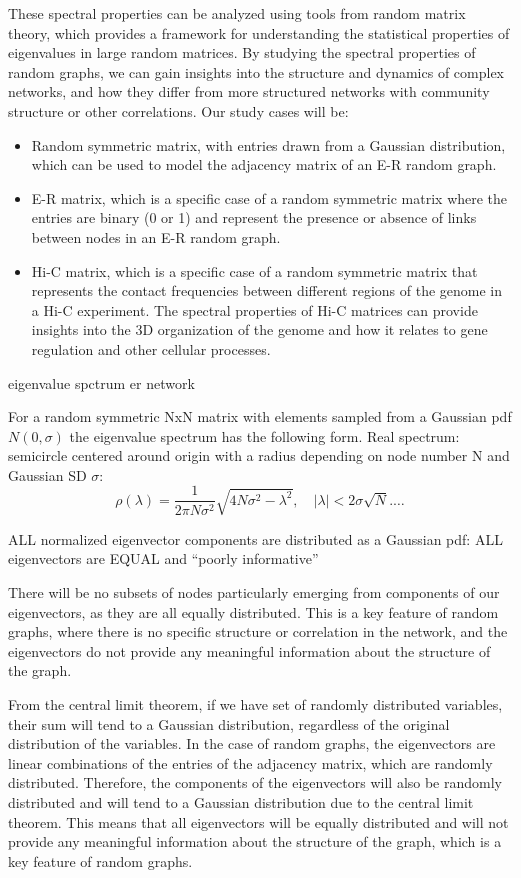 These spectral properties can be analyzed using tools from random matrix theory, which provides a framework for understanding the statistical properties of eigenvalues in large random matrices. By studying the spectral properties of random graphs, we can gain insights into the structure and dynamics of complex networks, and how they differ from more structured networks with community structure or other correlations. Our study cases will be:
\begin{itemize}
    \item Random symmetric matrix, with entries drawn from a Gaussian distribution, which can be used to model the adjacency matrix of an E-R random graph.
    \item E-R matrix, which is a specific case of a random symmetric matrix where the entries are binary (0 or 1) and represent the presence or absence of links between nodes in an E-R random graph.
    \item Hi-C matrix, which is a specific case of a random symmetric matrix that represents the contact frequencies between different regions of the genome in a Hi-C experiment. The spectral properties of Hi-C matrices can provide insights into the 3D organization of the genome and how it relates to gene regulation and other cellular processes.
\end{itemize}

eigenvalue spctrum er network


For a random symmetric NxN matrix with elements sampled from a Gaussian pdf \(N(0, \sigma)\) the eigenvalue spectrum has the following form. Real spectrum: semicircle centered around origin with a radius depending on node number N and Gaussian SD \(\sigma\):
\[
    \rho(\lambda) = \frac{1}{2\pi N \sigma^2} \sqrt{4N\sigma^2 - \lambda^2}, \quad |\lambda| < 2\sigma \sqrt{N}.   \dots
\]

ALL normalized eigenvector components are distributed as a Gaussian pdf: ALL eigenvectors are EQUAL and “poorly informative”

There will be no subsets of nodes particularly emerging from components of our eigenvectors, as they are all equally distributed. This is a key feature of random graphs, where there is no specific structure or correlation in the network, and the eigenvectors do not provide any meaningful information about the structure of the graph.

From the central limit theorem, if we have set of randomly distributed variables, their sum will tend to a Gaussian distribution, regardless of the original distribution of the variables. In the case of random graphs, the eigenvectors are linear combinations of the entries of the adjacency matrix, which are randomly distributed. Therefore, the components of the eigenvectors will also be randomly distributed and will tend to a Gaussian distribution due to the central limit theorem. This means that all eigenvectors will be equally distributed and will not provide any meaningful information about the structure of the graph, which is a key feature of random graphs.

